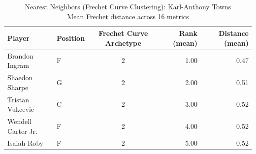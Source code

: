 \begin{table}[t]
\caption*{
{\fontsize{20}{25} Nearest Neighbors (Frechet Curve Clustering): Karl-Anthony Towns\fontsize{12}{15}\selectfont } \\ 
{\fontsize{14}{17}\selectfont  Mean Frechet distance across 16 metrics\fontsize{12}{15}\selectfont }
} 
\fontsize{12.0pt}{14.0pt}\selectfont
\begin{tabular*}{\linewidth}{@{\extracolsep{\fill}}llcrr}
\toprule
Player & Position & Frechet Curve Archetype & Rank (mean) & Distance (mean) \\ 
\midrule\addlinespace[2.5pt]
Brandon Ingram & F & 2 & 1.00 & 0.47 \\ 
Shaedon Sharpe & G & 2 & 2.00 & 0.51 \\ 
Tristan Vukcevic & C & 2 & 3.00 & 0.52 \\ 
Wendell Carter Jr. & F & 2 & 4.00 & 0.52 \\ 
Isaiah Roby & F & 2 & 5.00 & 0.52 \\ 
\bottomrule
\end{tabular*}
\end{table}

